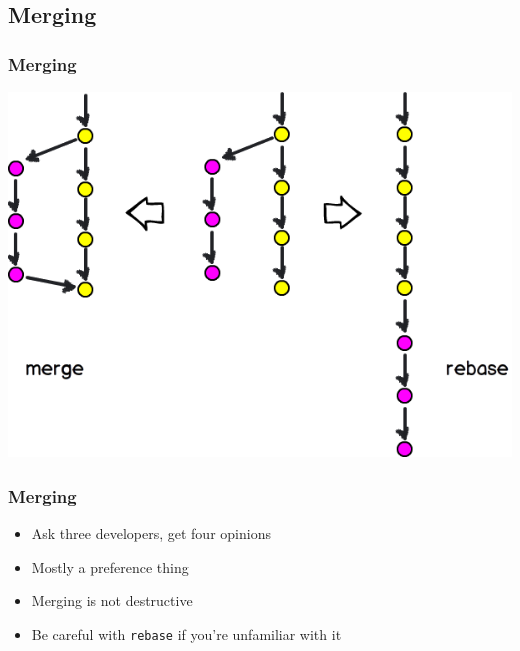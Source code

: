 \documentclass[presentation]{beamer}
\begin{document}
  \subsection{Merging}
  \begin{frame}
    \frametitle{Merging}
  
    \includegraphics[width=\textwidth]{merge-vs-rebase.png}
  \end{frame}
  \begin{frame}
    \frametitle{Merging}
  
    \begin{itemize}
      \item Ask three developers, get four opinions
      \item Mostly a preference thing 
      \item Merging is not destructive
      \item Be careful with \texttt{rebase} if you're unfamiliar with it
    \end{itemize}
  \end{frame}
\end{document}
